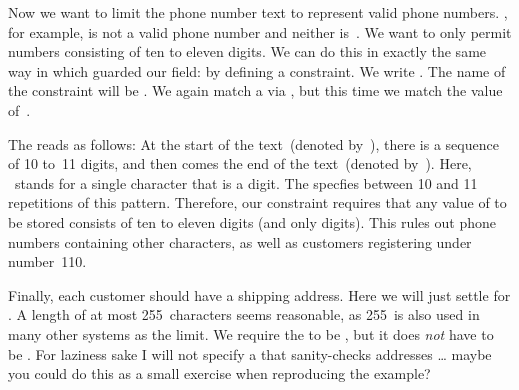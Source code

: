 Now we want to limit the phone number text to represent valid phone numbers.
, for example, is not a valid phone number and neither is~.
We want to only permit numbers consisting of ten to eleven digits.
We can do this in exactly the same way in which guarded our  field:
by defining a constraint.
We write \sqlIdx{\$}\sqlIdx{\^}\sqlIdx{\textasciitilde}.
The name of the constraint will be .
We again match a  via \sqlIdx{\textasciitilde}\sqlil{\~}, but this time we match the value of~.

The  \sqlIdx{\$}\sqlIdx{\^} reads as follows:
At the start of the text~(denoted by~\textil{\^}), there is a sequence of 10 to~11 digits, and then comes the end of the text~(denoted by~\textil{\$}\sqlIdx{\$}).
Here, \textil{\\d}\ stands for a single character that is a digit.
The  specfies between 10 and 11 repetitions of this pattern.
Therefore, our constraint requires that any value of  to be stored consists of ten to eleven digits (and only digits).
This rules out phone numbers containing other characters, as well as customers registering under number~110.

Finally, each customer should have a shipping address.
Here we will just settle for .
A length of at most 255~characters seems reasonable, as 255~is also used in many other systems as the limit.
We require the  to be , but it does \emph{not} have to be .
For laziness sake I will not specify a  that sanity-checks addresses {\dots} maybe you could do this as a small exercise when reproducing the example?

